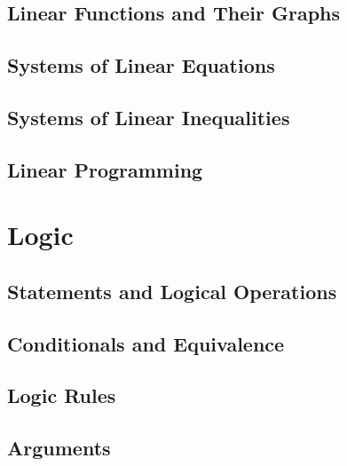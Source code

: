 \documentclass[9pt,letter,twoside,openright,fleqn]{memoir}
\begin{document}
\section{Linear Functions and Their Graphs}

\vfill
\pagebreak

\section{Systems of Linear Equations}

\vfill
\pagebreak

\section{Systems of Linear Inequalities}

\pagebreak

\section{Linear Programming}

\vfill
\pagebreak

\chapter{Logic}
\vfill
\pagebreak

\section{Statements and Logical Operations}


\section{Conditionals and Equivalence}


\section{Logic Rules}


\section{Arguments}

\vfill
\pagebreak
\end{document}
